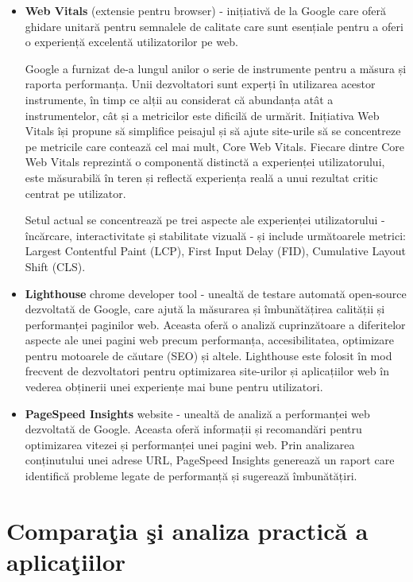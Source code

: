 \documentclass[12pt, a4paper]{report}
\begin{document}
\begin{itemize}
	\item  \textbf{Web Vitals} (extensie pentru browser) - inițiativă de la Google care oferă ghidare unitară pentru semnalele de calitate care sunt esențiale pentru a oferi o experiență excelentă utilizatorilor pe web.

	      Google a furnizat de-a lungul anilor o serie de instrumente pentru a măsura și raporta performanța. Unii dezvoltatori sunt experți în utilizarea acestor instrumente, în timp ce alții au considerat că abundanța atât a instrumentelor, cât și a metricilor este dificilă de urmărit.  Inițiativa Web Vitals își propune să simplifice peisajul și să ajute site-urile să se concentreze pe metricile care contează cel mai mult, Core Web Vitals. Fiecare dintre Core Web Vitals reprezintă o componentă distinctă a experienței utilizatorului, este măsurabilă în teren și reflectă experiența reală a unui rezultat critic centrat pe utilizator.

	      Setul actual se concentrează pe trei aspecte ale experienței utilizatorului - încărcare, interactivitate și stabilitate vizuală - și include următoarele metrici: Largest Contentful Paint (LCP), First Input Delay (FID), Cumulative Layout Shift (CLS).

	\item \textbf{Lighthouse} chrome developer tool - unealtă de testare automată open-source dezvoltată de Google, care ajută la măsurarea și îmbunătățirea calității și performanței paginilor web. Aceasta oferă o analiză cuprinzătoare a diferitelor aspecte ale unei pagini web precum performanța, accesibilitatea, optimizare pentru motoarele de căutare (SEO) și altele. Lighthouse este folosit în mod frecvent de dezvoltatori pentru optimizarea site-urilor și aplicațiilor web în vederea obținerii unei experiențe mai bune pentru utilizatori.

	\item \textbf{PageSpeed Insights} website - unealtă de analiză a performanței web dezvoltată de Google. Aceasta oferă informații și recomandări pentru optimizarea vitezei și performanței unei pagini web. Prin analizarea conținutului unei adrese URL, PageSpeed Insights generează un raport care identifică probleme legate de performanță și sugerează îmbunătățiri.
\end{itemize}

\section{Compara\c tia \c si analiza practică a aplica\c tiilor}
\end{document}
